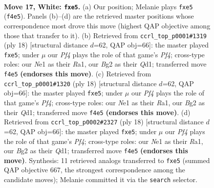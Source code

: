 \documentclass[11pt]{article}
\begin{document}
\clearpage

\begin{figure}[p]\centering
\begin{subfigure}{0.46\textwidth}\centering
\resizebox{\linewidth}{!}{%
\newchessgame
\chessboard[
  setfen={r1b1qrk1/5pb1/1pn2np1/p1p1p2p/2P2P1P/BPN5/P2P2B1/1R1QNRK1 w - - 0 17},
  showmover=false,
  pgfstyle=straightmove, color=movearrow, markmove={f4-e5}
]}
\caption{}
\end{subfigure}\hfill
\begin{subfigure}{0.46\textwidth}\centering
\resizebox{\linewidth}{!}{%
\newchessgame
\chessboard[
  setfen={r1bq1rk1/pp3pbp/2np1np1/4p3/4PP2/1NN1B3/PPP1B1PP/R2QK2R w KQ - 0 10},
  showmover=false,
  pgfstyle=straightmove, color=movearrow, markmove={f4-e5}
]}
\caption{}
\end{subfigure}
\\[4pt]
\begin{subfigure}{0.46\textwidth}\centering
\resizebox{\linewidth}{!}{%
\newchessgame
\chessboard[
  setfen={r1bq1rk1/pp3pbp/2np1np1/4p3/4PP2/1NN1B3/PPP1B1PP/R2QK2R w KQ - 0 10},
  showmover=false,
  pgfstyle=straightmove, color=movearrow, markmove={f4-e5}
]}
\caption{}
\end{subfigure}\hfill
\begin{subfigure}{0.46\textwidth}\centering
\resizebox{\linewidth}{!}{%
\newchessgame
\chessboard[
  setfen={r1bq1rk1/pp3pbp/2np1np1/4p3/4PP2/1NN1B3/PPP1B1PP/R2QK2R w KQ - 0 10},
  showmover=false,
  pgfstyle=straightmove, color=movearrow, markmove={f4-e5}
]}
\caption{}
\end{subfigure}
\caption{\textbf{Move 17, White: \texttt{fxe5}.} (a) Our position; Melanie plays \texttt{fxe5} (\texttt{f4e5}). Panels (b)--(d) are the retrieved master positions whose correspondence most drove this move (highest QAP objective among those that transfer to it). (b) Retrieved from \texttt{ccrl\_top\_p0001\#1319} (ply 18) [structural distance $d$=62, QAP obj=66]: the master played \texttt{fxe5}; under $\mu$ our \emph{Pf4} plays the role of that game's \emph{Pf4}; cross-type roles: our \emph{N}e1 as their \emph{R}a1, our \emph{B}g2 as their \emph{Q}d1; transferred move \texttt{f4e5} \textbf{(endorses this move)}. (c) Retrieved from \texttt{ccrl\_top\_p0001\#1320} (ply 18) [structural distance $d$=62, QAP obj=66]: the master played \texttt{fxe5}; under $\mu$ our \emph{Pf4} plays the role of that game's \emph{Pf4}; cross-type roles: our \emph{N}e1 as their \emph{R}a1, our \emph{B}g2 as their \emph{Q}d1; transferred move \texttt{f4e5} \textbf{(endorses this move)}. (d) Retrieved from \texttt{ccrl\_top\_p0002\#2327} (ply 18) [structural distance $d$=62, QAP obj=66]: the master played \texttt{fxe5}; under $\mu$ our \emph{Pf4} plays the role of that game's \emph{Pf4}; cross-type roles: our \emph{N}e1 as their \emph{R}a1, our \emph{B}g2 as their \emph{Q}d1; transferred move \texttt{f4e5} \textbf{(endorses this move)}. Synthesis: 11 retrieved analogs transferred to \texttt{fxe5} (summed QAP objective 667, the strongest correspondence among the candidate moves); Melanie committed it via the \texttt{search} selector.}
\label{fig:thought-m32}
\end{figure}
\end{document}
